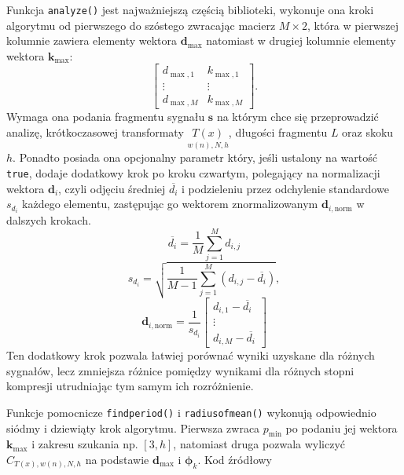 \documentclass[pl,12pt]{aghdpl}
\begin{document}
Funkcja \lstinline|analyze()| jest najważniejszą częścią biblioteki, wykonuje
ona kroki algorytmu od pierwszego do szóstego zwracając macierz $M \times 2$,
która w pierwszej kolumnie zawiera elementy wektora $\bm d_{\max}$ natomiast w
drugiej kolumnie elementy wektora $\bm k_{\max}$:
\[\begin{bmatrix}
    d_{\max,1} & k_{\max,1}\\
    \vdots & \vdots\\
    d_{\max,M} & k_{\max,M}
\end{bmatrix}.\]
Wymaga ona podania fragmentu sygnału $\bm s$ na którym chce się przeprowadzić
analizę, krótkoczasowej transformaty $\underset{w(n),N,h}{T(x)}$, długości
fragmentu $L$ oraz skoku $h$. Ponadto posiada ona opcjonalny parametr który,
jeśli ustalony na wartość \lstinline|true|, dodaje dodatkowy krok po kroku
czwartym, polegający na normalizacji wektora $\bm d_i$, czyli odjęciu średniej
$\overline{d_i}$ i podzieleniu przez odchylenie standardowe $s_{d_i}$ każdego
elementu, zastępując go wektorem znormalizowanym $\bm d_{i, \text{norm}}$ w
dalszych krokach.
\begin{equation}
  \overline{d_i} = \frac{1}{M}\sum_{j=1}^{M}d_{i,j}
\end{equation}
\begin{equation}
  s_{d_i} = \sqrt{\frac{1}{M-1}\sum_{j=1}^{M}\left(d_{i, j} -
  \overline{d_{i}}\right)},
\end{equation}
\begin{equation}
  \bm d_{i, \text{norm}} = \frac{1}{s_{d_i}}\begin{bmatrix}
    d_{i,1} - \overline{d_i}\\
    \vdots\\
    d_{i,M} - \overline{d_i}
  \end{bmatrix}
\end{equation}
Ten dodatkowy krok pozwala łatwiej porównać wyniki uzyskane dla różnych
sygnałów, lecz zmniejsza różnice pomiędzy wynikami dla różnych stopni kompresji
utrudniając tym samym ich rozróżnienie.

Funkcje pomocnicze \lstinline|findperiod()| i \lstinline|radiusofmean()|
wykonują odpowiednio siódmy i dziewiąty krok algorytmu. Pierwsza zwraca
$p_{\min}$ po podaniu jej wektora $\bm k_{\max}$ i zakresu szukania np.
$[3,h]$, natomiast druga pozwala wyliczyć $C_{T(x),w(n),N,h}$ na podstawie $\bm
d_{\max}$ i $\bm\phi_k$. Kod źródłowy 
\end{document}
